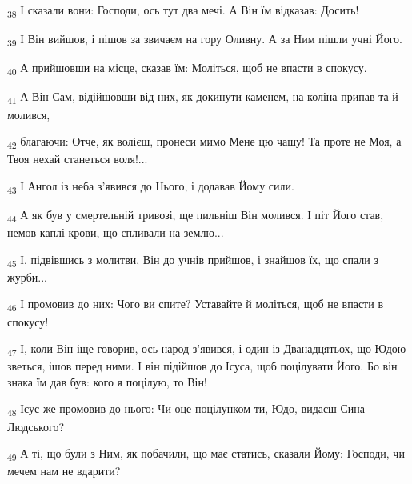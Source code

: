 \begin{tcolorbox}
\textsubscript{38} І сказали вони: Господи, ось тут два мечі. А Він їм відказав: Досить!
\end{tcolorbox}
\begin{tcolorbox}
\textsubscript{39} І Він вийшов, і пішов за звичаєм на гору Оливну. А за Ним пішли учні Його.
\end{tcolorbox}
\begin{tcolorbox}
\textsubscript{40} А прийшовши на місце, сказав їм: Моліться, щоб не впасти в спокусу.
\end{tcolorbox}
\begin{tcolorbox}
\textsubscript{41} А Він Сам, відійшовши від них, як докинути каменем, на коліна припав та й молився,
\end{tcolorbox}
\begin{tcolorbox}
\textsubscript{42} благаючи: Отче, як волієш, пронеси мимо Мене цю чашу! Та проте не Моя, а Твоя нехай станеться воля!...
\end{tcolorbox}
\begin{tcolorbox}
\textsubscript{43} І Ангол із неба з'явився до Нього, і додавав Йому сили.
\end{tcolorbox}
\begin{tcolorbox}
\textsubscript{44} А як був у смертельній тривозі, ще пильніш Він молився. І піт Його став, немов каплі крови, що спливали на землю...
\end{tcolorbox}
\begin{tcolorbox}
\textsubscript{45} І, підвівшись з молитви, Він до учнів прийшов, і знайшов їх, що спали з журби...
\end{tcolorbox}
\begin{tcolorbox}
\textsubscript{46} І промовив до них: Чого ви спите? Уставайте й моліться, щоб не впасти в спокусу!
\end{tcolorbox}
\begin{tcolorbox}
\textsubscript{47} І, коли Він іще говорив, ось народ з'явився, і один із Дванадцятьох, що Юдою зветься, ішов перед ними. І він підійшов до Ісуса, щоб поцілувати Його. Бо він знака їм дав був: кого я поцілую, то Він!
\end{tcolorbox}
\begin{tcolorbox}
\textsubscript{48} Ісус же промовив до нього: Чи оце поцілунком ти, Юдо, видаєш Сина Людського?
\end{tcolorbox}
\begin{tcolorbox}
\textsubscript{49} А ті, що були з Ним, як побачили, що має статись, сказали Йому: Господи, чи мечем нам не вдарити?
\end{tcolorbox}
